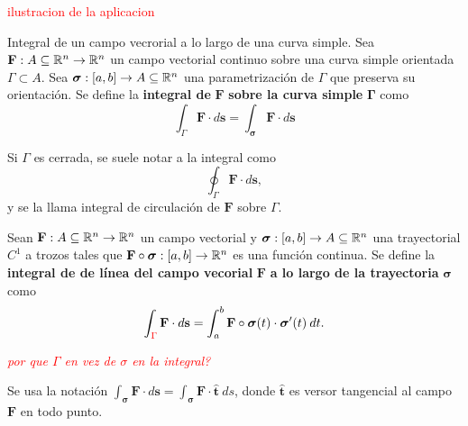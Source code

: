 \textcolor{red}{ilustracion de la aplicacion}

\begin{definition}
    Integral de un campo vecrorial a lo largo de una curva simple.
    Sea $\mathbf{F}:A\subseteq\mathbb{R}^n\to\mathbb{R}^n$ un campo vectorial continuo sobre una curva simple orientada $\Gamma\subset A$. Sea $\boldsymbol{\sigma}:[a,b]\to A\subseteq\mathbb{R}^n$ una parametrizaci\'on de $\Gamma$ que preserva su orientaci\'on. Se define la \textbf{integral de} $\mathbf{F}$ \textbf{sobre la curva simple} $\boldsymbol{\Gamma}$ como
    \[
        \int_{\Gamma}\mathbf{F}\cdot d\mathbf{s}=\int_{\boldsymbol{\sigma}}\mathbf{F}\cdot d\mathbf{s} 
    \]
\end{definition}

Si $\Gamma$ es cerrada, se suele notar a la integral como
\[
    \oint_{\Gamma}\mathbf{F}\cdot d\mathbf{s},  
\]
y se la llama integral de circulaci\'on de $\mathbf{F}$ sobre $\Gamma$.

\begin{definition}
    Sean $\mathbf{F}:A\subseteq\mathbb{R}^n\to\mathbb{R}^n$ un campo vectorial y $\boldsymbol{\sigma}:[a,b]\to A\subseteq\mathbb{R}^n$ una trayectorial $C^1$ a trozos tales que $\mathbf{F}\circ\boldsymbol{\sigma}:[a,b]\to\mathbb{R}^n$ es una funci\'on continua. Se define la \textbf{integral de de l\'inea del campo vecorial} $\mathbf{F}$ \textbf{a lo largo de la trayectoria} $\boldsymbol{\sigma}$ como
    \[
        \int_{\textcolor{red}{\Gamma}}\mathbf{F}\cdot d\mathbf{s}=\int_a^b\mathbf{F}\circ\boldsymbol{\sigma}(t)\cdot\boldsymbol{\sigma}'(t)\:dt. 
    \]
\end{definition}
\textcolor{red}{\textit{por que $\Gamma$ en vez de $\sigma$ en la integral?}}

Se usa la notaci\'on $\int_{\boldsymbol{\sigma}}\mathbf{F}\cdot d\mathbf{s}=\int_{\boldsymbol{\sigma}}\mathbf{F}\cdot\hat{\mathbf{t}}\:ds$, donde $\hat{\mathbf{t}}$ es versor tangencial al campo $\mathbf{F}$ en todo punto.
